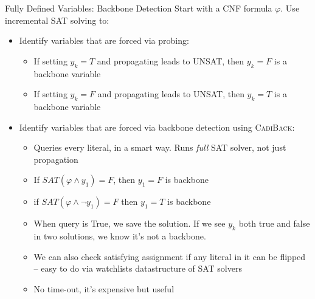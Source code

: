 \documentclass[aspectratio=169]{beamer}
\begin{document}
\begin{frame}{Fully Defined Variables: Backbone Detection}
Start with a CNF formula $ \varphi$. Use incremental SAT solving to:
\begin{itemize}
    \item Identify variables that are forced via probing:
        \begin{itemize}
            \item If setting $y_k = T$ and propagating leads to UNSAT, then
                $y_k = F$ is a backbone variable
            \item If setting $y_k = F$ and propagating leads to UNSAT, then
                $y_k = T$ is a backbone variable
        \end{itemize}
    \item Identify variables that are forced via backbone detection
        using \textsc{CadiBack}:
        \begin{itemize}
            \item Queries every literal, in a smart way. Runs
                \emph{full} SAT solver, not just propagation
            \item If $SAT(\varphi \land y_1) = F$, then $y_1 = F$ is backbone
            \item if $SAT(\varphi \land \neg y_1) = F$ then $y_1 = T$ is backbone
            \item When query is True, we save the solution. If we see $y_k$ both
                true and false in two solutions, we know it's not a backbone.
            \item We can also check satisfying assignment if any literal
                in it can be flipped -- easy to do via watchlists
                datastructure of SAT solvers
            \item No time-out, it's expensive but useful
        \end{itemize}
\end{itemize}
\end{frame}
\end{document}
